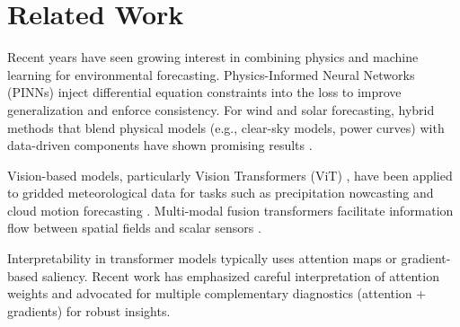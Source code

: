 \section*{Related Work}

Recent years have seen growing interest in combining physics and machine learning for environmental forecasting. Physics-Informed Neural Networks (PINNs) \cite{raissi2019physics} inject differential equation constraints into the loss to improve generalization and enforce consistency. For wind and solar forecasting, hybrid methods that blend physical models (e.g., clear-sky models, power curves) with data-driven components have shown promising results \cite{liu2020hybrid, li2021physics}.

Vision-based models, particularly Vision Transformers (ViT) \cite{dosovitskiy2021image}, have been applied to gridded meteorological data for tasks such as precipitation nowcasting and cloud motion forecasting \cite{nowcasting_vit}. Multi-modal fusion transformers facilitate information flow between spatial fields and scalar sensors \cite{multimodal_transformers}.

Interpretability in transformer models typically uses attention maps or gradient-based saliency. Recent work has emphasized careful interpretation of attention weights \cite{jain2019attention} and advocated for multiple complementary diagnostics (attention + gradients) for robust insights.
